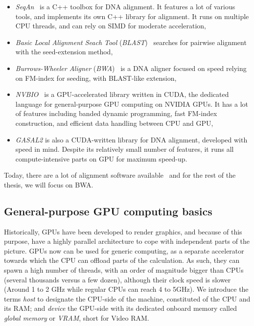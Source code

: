 \begin{itemize}
    \item \emph{SeqAn}~\cite{Doring:seqan} is a C++ toolbox for DNA alignment. It features a lot of various tools, and implements its own C++ library for alignment. It runs on multiple CPU threads, and can rely on SIMD for moderate acceleration,
    \item \emph{Basic Local Alignment Seach Tool} (\emph{BLAST})~\cite{Altschul:BLAST} searches for pairwise alignment with the seed-extension method,
    \item \emph{Burrows-Wheeler Aligner} (\emph{BWA})~\cite{li:bwa} is a DNA aligner focused on speed relying on FM-index for seeding, with BLAST-like extension,
    \item \emph{NVBIO}~\cite{nvidia:nvbio} is a GPU-accelerated library written in CUDA, the dedicated language for general-purpose GPU computing on NVIDIA GPUs. It has a lot of features including banded dynamic programming, fast FM-index construction, and efficient data handling between CPU and GPU,
    \item \emph{GASAL2} is also a CUDA-written library for DNA alignment, developed with speed in mind. Despite its relatively small number of features, it runs all compute-intensive parts on GPU for maximum speed-up.
\end{itemize}

Today, there are a lot of alignment software available~\cite{wiki:ListAlignmentSoft} and for the rest of the thesis, we will focus on BWA.

\subsection{General-purpose GPU computing basics}

Historically, GPUs have been developed to render graphics, and because of this purpose, have a highly parallel architecture to cope with independent parts of the picture. GPUs now can be used for generic computing, as a separate accelerator towards which the CPU can offload parts of the calculation. As such, they can spawn a high number of threads, with an order of magnitude bigger than CPUs (several thousands versus a few dozen), although their clock speed is slower (Around 1 to 2 GHz while regular CPUs can reach 4 to 5GHz). We introduce the terms \emph{host} to designate the CPU-side of the machine, constituted of the CPU and its RAM; and \emph{device} the GPU-side with its dedicated onboard memory called \emph{global memory} or \emph{VRAM}, short for Video RAM.

